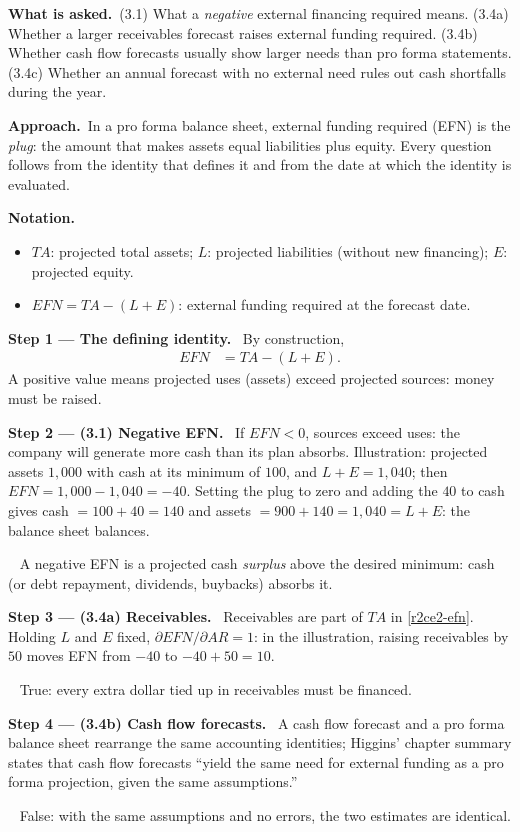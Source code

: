 \documentclass[11pt,a4paper]{article}
\newcommand{\notation}{\par\noindent\textbf{Notation.}}
\newcommand{\step}[2]{\par\medskip\noindent\textbf{Step #1 --- #2.}~}
\newcommand{\asked}{\par\medskip\noindent\textbf{What is asked.}~}
\newcommand{\approach}{\par\smallskip\noindent\textbf{Approach.}~}
\newcommand{\answer}[1]{\par\smallskip\noindent\fbox{\textbf{Answer #1.}}~}
\newcommand{\EFN}{\mathit{EFN}}
\begin{document}
\asked (3.1) What a \emph{negative} external financing required means. (3.4a) Whether a larger
receivables forecast raises external funding required. (3.4b) Whether cash flow forecasts usually show
larger needs than pro forma statements. (3.4c) Whether an annual forecast with no external need rules
out cash shortfalls during the year.

\approach In a pro forma balance sheet, external funding required (EFN) is the \emph{plug}: the amount
that makes assets equal liabilities plus equity. Every question follows from the identity that defines
it and from the date at which the identity is evaluated.

\notation
\begin{itemize}
  \item $TA$: projected total assets; $L$: projected liabilities (without new financing); $E$: projected equity.
  \item $\EFN = TA-(L+E)$: external funding required at the forecast date.
\end{itemize}

\step{1}{The defining identity} By construction,
\begin{align}
  \EFN &= TA-(L+E). \label{r2ce2-efn}
\end{align}
A positive value means projected uses (assets) exceed projected sources: money must be raised.

\step{2}{(3.1) Negative EFN} If $\EFN<0$, sources exceed uses: the company will generate more cash than
its plan absorbs. Illustration: projected assets $1{,}000$ with cash at its minimum of $100$, and
$L+E=1{,}040$; then $\EFN=1{,}000-1{,}040=-40$. Setting the plug to zero and adding the $40$ to cash gives
cash $=100+40=140$ and assets $=900+140=1{,}040=L+E$: the balance sheet balances.
\answer{(3.1)} A negative EFN is a projected cash \emph{surplus} above the desired minimum: cash (or
debt repayment, dividends, buybacks) absorbs it.

\step{3}{(3.4a) Receivables} Receivables are part of $TA$ in \eqref{r2ce2-efn}. Holding $L$ and $E$
fixed, $\partial \EFN/\partial AR=1$: in the illustration, raising receivables by $50$ moves EFN from
$-40$ to $-40+50=10$.
\answer{(3.4a)} True: every extra dollar tied up in receivables must be financed.

\step{4}{(3.4b) Cash flow forecasts} A cash flow forecast and a pro forma balance sheet rearrange the
same accounting identities; Higgins' chapter summary states that cash flow forecasts ``yield the same
need for external funding as a pro forma projection, given the same assumptions.''
\answer{(3.4b)} False: with the same assumptions and no errors, the two estimates are identical.
\end{document}
